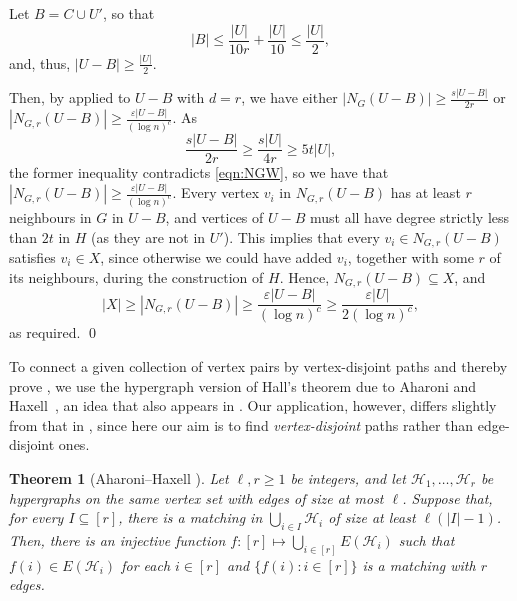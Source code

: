 \documentclass[10pt]{article}
\theoremstyle{plain}
\newtheorem{theorem}{Theorem}
\numberwithin{theorem}{section}
\theoremstyle{definition}
\theoremstyle{remark}
\renewenvironment{proof}[1][]{\begin{trivlist}
\item[\hspace{\labelsep}{\bf\noindent Proof#1.\/}] }{\qed\end{trivlist}}
\newcommand{\cH}{\mathcal{H}}
\renewcommand{\setminus}{-}
\newcommand{\eps}{\varepsilon}
\theoremstyle{plain}
\begin{document}
\begin{proof}
		Let $B=C \cup U'$, so that
		\[
			|B|\leq \frac{|U|}{10r}+\frac{|U|}{10}\le \frac{|U|}{2},
		\]
		and, thus, $|U\setminus B|\geq \frac{|U|}2$.

		Then, by  applied to $U\setminus B$ with $d=r$, we have either $|N_{G}(U\setminus B)|\geq \frac{s|U\setminus B|}{2r}$ or $|N_{G,r}(U\setminus B)|\geq \frac{\eps |U\setminus B|}{(\log n)^c}$. As $$\frac{s|U\setminus B|}{2r}\geq \frac{s|U|}{4r}\geq 5t|U|,$$ the former inequality contradicts \eqref{eqn:NGW}, so we have that $|N_{G,r}(U\setminus B)|\geq \frac{\eps |U\setminus B|}{(\log n)^c}$. 
		Every vertex $v_i$ in $N_{G,r}(U\setminus B)$ has at least $r$ neighbours in $G$ in $U\setminus B$, and vertices of $U\setminus B$ must all have degree strictly less than $2t$ in $H$ (as they are not in $U'$). This implies that every $v_i \in N_{G,r}(U\setminus B)$ satisfies $v_i \in X$, since otherwise we could have added $v_i$, together with some $r$ of its neighbours, during the construction of $H$. Hence, $N_{G,r}(U\setminus B)\subseteq X$, and 
		\[
			|X|\geq |N_{G,r}(U\setminus B)|\geq \frac{\eps |U\setminus B|}{(\log n)^c}\geq  \frac{\eps|U|}{2(\log n)^c},
		\]
		as required.
	\end{proof}

To connect a given collection of vertex pairs by vertex-disjoint paths and thereby prove , we use the hypergraph version of Hall's theorem due to Aharoni and Haxell~\cite{aharoni2000hall}, an idea that also appears in \cite{bucic2022erdos}. Our application, however, differs slightly from that in \cite{bucic2022erdos}, since here our aim is to find \emph{vertex-disjoint} paths rather than edge-disjoint ones.
 
     
	\begin{theorem}[Aharoni--Haxell \cite{aharoni2000hall}] \label{thm:hall}
		Let $\ell,r \ge 1$ be integers, and let $\cH_1, \ldots, \cH_r$ be hypergraphs on the same vertex set with edges of size at most $\ell$. Suppose that, for every $I \subseteq [r]$, there is a matching in $\bigcup_{i \in I} \cH_i$ of size at least $\ell(|I|-1)$. 
		Then, there is an injective function $f : [r] \mapsto \bigcup_{i \in [r]} E(\cH_i)$ such that $f(i) \in E(\cH_i)$ for each $i \in [r]$ and $\{f(i) : i \in [r]\}$ is a matching with $r$ edges.
	\end{theorem}
\end{document}
